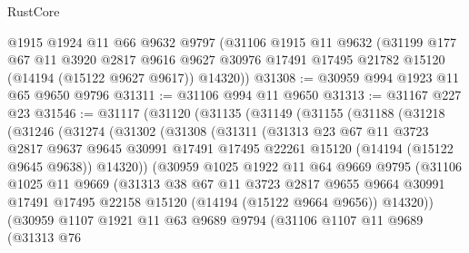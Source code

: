 \begin{lexlean}{RustCore}
\begin{coremodule}
    @1915
    @1924
    @11
    @66
    @9632
    @9797
    (@31106
      @1915
      @11
      @9632
      (@31199
        @177
        @67
        @11
        @3920
        @2817
        @9616
        @9627
        @30976
        @17491
        @17495
        @21782
        @15120
        (@14194 (@15122 @9627 @9617))
        @14320))
@31308 := @30959 @994 @1923 @11 @65 @9650 @9796
@31311 := @31106 @994 @11 @9650
@31313 := @31167 @227 @23
@31546 := @31117
    (@31120
      (@31135
        (@31149
          (@31155
            (@31188
              (@31218
                (@31246
                  (@31274
                    (@31302
                      (@31308
                        (@31311
                          (@31313
                            @23
                            @67
                            @11
                            @3723
                            @2817
                            @9637
                            @9645
                            @30991
                            @17491
                            @17495
                            @22261
                            @15120
                            (@14194 (@15122 @9645 @9638))
                            @14320))
                        (@30959
                          @1025
                          @1922
                          @11
                          @64
                          @9669
                          @9795
                          (@31106
                            @1025
                            @11
                            @9669
                            (@31313
                              @38
                              @67
                              @11
                              @3723
                              @2817
                              @9655
                              @9664
                              @30991
                              @17491
                              @17495
                              @22158
                              @15120
                              (@14194 (@15122 @9664 @9656))
                              @14320))
                          (@30959
                            @1107
                            @1921
                            @11
                            @63
                            @9689
                            @9794
                            (@31106
                              @1107
                              @11
                              @9689
                              (@31313
                                @76

\end{coremodule}
\end{lexlean}
